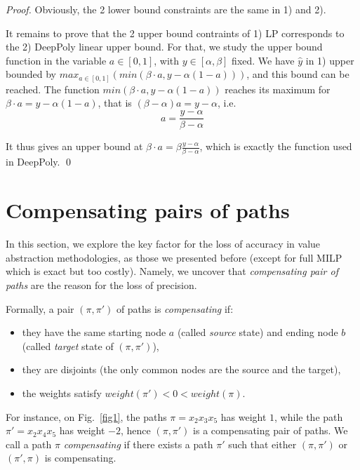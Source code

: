 \documentclass{llncs}
\begin{document}
\begin{proof}
Obviously, the 2 lower bound constraints are the same in 1) and 2).

It remains to prove that the 2 upper bound contraints of 1) LP corresponds to the 2) DeepPoly linear upper bound. For that, we study the upper bound function in the variable $a \in  [0,1]$, with $y \in [\alpha,\beta]$ fixed. We have $\hat{y}$ in 1) upper bounded by $max_{a \in [0,1]} (min(\beta \cdot a, y - \alpha (1-a)))$, and this bound can be reached. 
The function $min(\beta \cdot a, y - \alpha (1-a))$ reaches its maximum for 
$\beta \cdot a = y - \alpha (1-a)$, that is 
$(\beta - \alpha) a = y - \alpha$, i.e. 
$$ a = \frac{y - \alpha}{\beta-\alpha}$$

It thus gives an upper bound at 
$\beta \cdot a = \beta \frac{y - \alpha}{\beta-\alpha}$, which is exactly the function used in DeepPoly.
\qed
\end{proof}







\section{Compensating pairs of paths}
\label{Sec.comp}

In this section, we explore the key factor for the loss of accuracy in value abstraction methodologies, as those we presented before (except for full MILP which is exact but too costly). 
Namely, we uncover that \emph{compensating pair of paths} are the reason for the loss of precision.

Formally, a pair $(\pi,\pi')$ of paths is {\em compensating} if:
\begin{itemize}
 \item they have the same starting node $a$ (called {\em source} state) and ending node $b$ (called {\em target} state of $(\pi,\pi')$),
 \item they are disjoints (the only common nodes are the source and the target),
 \item the weights satisfy $weight(\pi') < 0 < weight(\pi)$.
\end{itemize}

For instance, on Fig.~\ref{fig1}, the paths $\pi= x_2 x_3 x_5$ has weight $1$, while the
path $\pi'= x_2 x_4 x_5$ has weight $-2$, hence $(\pi,\pi')$ is a compensating pair of paths.
We call a path $\pi$ {\em compensating} if there exists a path $\pi'$ such that either $(\pi,\pi')$ or 
$(\pi',\pi)$ is compensating.
\end{document}
